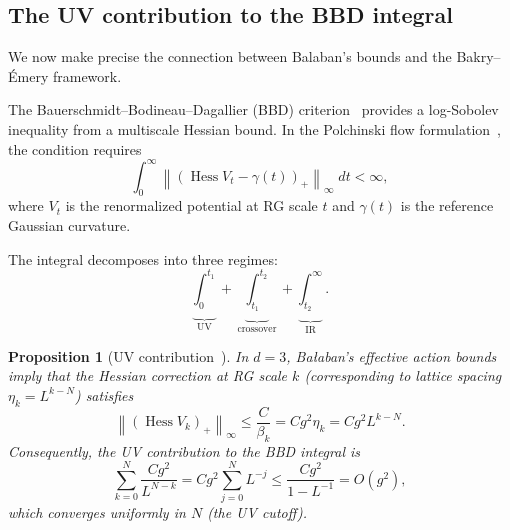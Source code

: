 \documentclass[11pt,a4paper]{article}
\theoremstyle{plain}
\newtheorem{proposition}[theorem]{Proposition}
\theoremstyle{definition}
\theoremstyle{remark}
\newcommand{\Hess}{\operatorname{Hess}}
\begin{document}
\subsection{The UV contribution to the BBD integral}
\label{sec:bbd_uv}

We now make precise the connection between Balaban's
bounds and the Bakry--\'Emery framework.

The Bauerschmidt--Bodineau--Dagallier (BBD)
criterion~\cite{BBD24} provides a log-Sobolev inequality
from a multiscale Hessian bound. In the Polchinski flow
formulation~\cite{FontesBBD}, the condition requires
\begin{equation}\label{eq:bbd_integral}
  \int_0^\infty \left\|\left(\Hess V_t - \gamma(t)\right)_+
  \right\|_\infty \; dt < \infty,
\end{equation}
where $V_t$ is the renormalized potential at RG scale $t$
and $\gamma(t)$ is the reference Gaussian curvature.

The integral decomposes into three regimes:
\begin{equation}\label{eq:three_regimes}
  \underbrace{\int_0^{t_1}}_{\text{UV}}
  + \underbrace{\int_{t_1}^{t_2}}_{\text{crossover}}
  + \underbrace{\int_{t_2}^{\infty}}_{\text{IR}}.
\end{equation}

\begin{proposition}[UV contribution~\cite{FontesBBD}]
\label{prop:uv_bbd}
In $d = 3$, Ba{\l}aban's effective action
bounds~\cite{Bal85e} imply that the Hessian correction
at RG scale $k$ (corresponding to lattice spacing
$\eta_k = L^{k-N}$) satisfies
\begin{equation}\label{eq:hessian_3d}
  \left\|(\Hess V_k)_+\right\|_\infty
  \le \frac{C}{\beta_k} = C g^2 \eta_k = C g^2 L^{k-N}.
\end{equation}
Consequently, the UV contribution to the BBD
integral is
\begin{equation}
  \sum_{k=0}^{N} \frac{C g^2}{L^{N-k}}
  = C g^2 \sum_{j=0}^{N} L^{-j}
  \le \frac{C g^2}{1 - L^{-1}} = O(g^2),
\end{equation}
which converges uniformly in $N$ (the UV cutoff).
\end{proposition}
\end{document}
